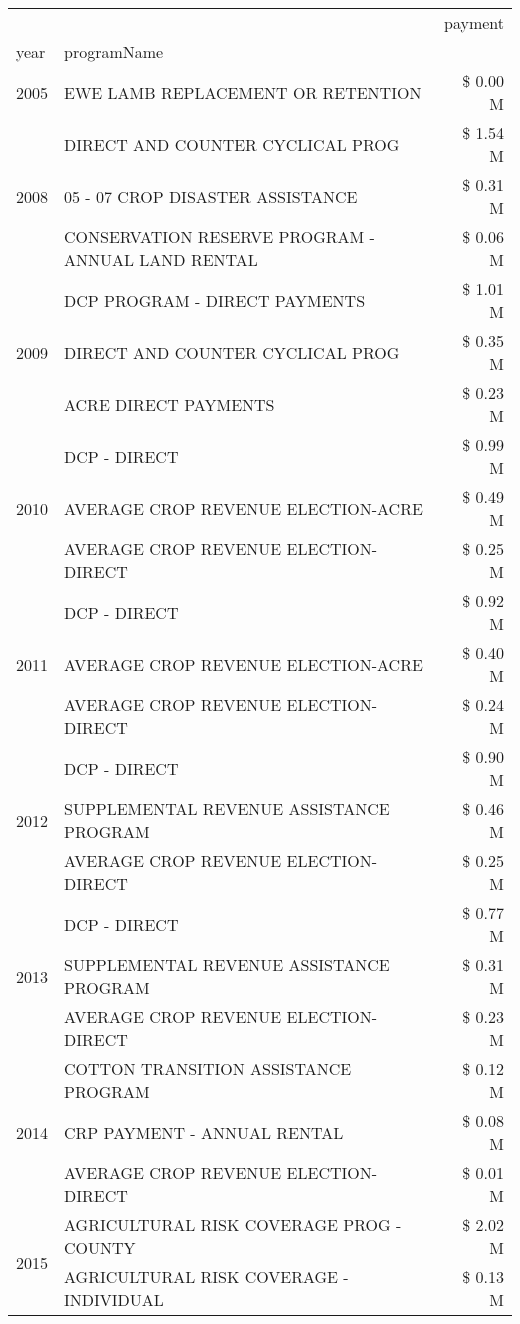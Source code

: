 \begin{tabular}{llr}
\toprule
 &  & payment \\
year & programName &  \\
\midrule
2005 & EWE LAMB REPLACEMENT OR RETENTION & \$ 0.00 M \\
\cline{1-3}
\multirow[t]{3}{*}{2008} & DIRECT AND COUNTER CYCLICAL PROG & \$ 1.54 M \\
 & 05 - 07 CROP DISASTER ASSISTANCE & \$ 0.31 M \\
 & CONSERVATION RESERVE PROGRAM - ANNUAL LAND RENTAL & \$ 0.06 M \\
\cline{1-3}
\multirow[t]{3}{*}{2009} & DCP PROGRAM - DIRECT PAYMENTS & \$ 1.01 M \\
 & DIRECT AND COUNTER CYCLICAL PROG & \$ 0.35 M \\
 & ACRE DIRECT PAYMENTS & \$ 0.23 M \\
\cline{1-3}
\multirow[t]{3}{*}{2010} & DCP - DIRECT & \$ 0.99 M \\
 & AVERAGE CROP REVENUE ELECTION-ACRE & \$ 0.49 M \\
 & AVERAGE CROP REVENUE ELECTION-DIRECT & \$ 0.25 M \\
\cline{1-3}
\multirow[t]{3}{*}{2011} & DCP - DIRECT & \$ 0.92 M \\
 & AVERAGE CROP REVENUE ELECTION-ACRE & \$ 0.40 M \\
 & AVERAGE CROP REVENUE ELECTION-DIRECT & \$ 0.24 M \\
\cline{1-3}
\multirow[t]{3}{*}{2012} & DCP - DIRECT & \$ 0.90 M \\
 & SUPPLEMENTAL REVENUE ASSISTANCE PROGRAM & \$ 0.46 M \\
 & AVERAGE CROP REVENUE ELECTION-DIRECT & \$ 0.25 M \\
\cline{1-3}
\multirow[t]{3}{*}{2013} & DCP - DIRECT & \$ 0.77 M \\
 & SUPPLEMENTAL REVENUE ASSISTANCE PROGRAM & \$ 0.31 M \\
 & AVERAGE CROP REVENUE ELECTION-DIRECT & \$ 0.23 M \\
\cline{1-3}
\multirow[t]{3}{*}{2014} & COTTON TRANSITION ASSISTANCE PROGRAM & \$ 0.12 M \\
 & CRP PAYMENT - ANNUAL RENTAL & \$ 0.08 M \\
 & AVERAGE CROP REVENUE ELECTION-DIRECT & \$ 0.01 M \\
\cline{1-3}
\multirow[t]{3}{*}{2015} & AGRICULTURAL RISK COVERAGE PROG - COUNTY & \$ 2.02 M \\
 & AGRICULTURAL RISK COVERAGE - INDIVIDUAL & \$ 0.13 M \\

\end{tabular}
